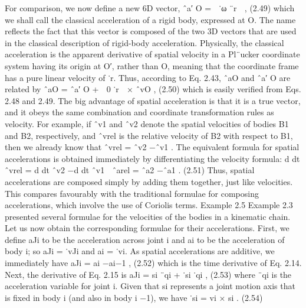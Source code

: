 For comparison, we now define a new 6D vector, ˆa′ O =  ˙ω ¨r  , (2.49) which we shall call the classical acceleration of a rigid body, expressed at O. The name reflects the fact that this vector is composed of the two 3D vectors that are used in the classical description of rigid-body acceleration. Physically, the classical acceleration is the apparent derivative of spatial velocity in a Pl¨ucker coordinate system having its origin at O′, rather than O, meaning that the coordinate frame has a pure linear velocity of ˙r. Thus, according to Eq. 2.43, ˆaO and ˆa′ O are related by ˆaO = ˆa′ O +  0 ˙r  × ˆvO , (2.50) which is easily verified from Eqs. 2.48 and 2.49. The big advantage of spatial acceleration is that it is a true vector, and it obeys the same combination and coordinate transformation rules as velocity. For example, if ˆv1 and ˆv2 denote the spatial velocities of bodies B1 and B2, respectively, and ˆvrel is the relative velocity of B2 with respect to B1, then we already know that ˆvrel = ˆv2 −ˆv1 . The equivalent formula for spatial accelerations is obtained immediately by differentiating the velocity formula: d dt ˆvrel = d dt ˆv2 −d dt ˆv1 ⇒ ˆarel = ˆa2 −ˆa1 . (2.51) Thus, spatial accelerations are composed simply by adding them together, just like velocities. This compares favourably with the traditional formulae for composing accelerations, which involve the use of Coriolis terms. Example 2.5 Example 2.3 presented several formulae for the velocities of the bodies in a kinematic chain. Let us now obtain the corresponding formulae for their accelerations. First, we define aJi to be the acceleration across joint i and ai to be the acceleration of body i; so aJi = ˙vJi and ai = ˙vi. As spatial accelerations are additive, we immediately have aJi = ai −ai−1 , (2.52) which is the time derivative of Eq. 2.14. Next, the derivative of Eq. 2.15 is aJi = si ¨qi + ˙si ˙qi , (2.53) where ¨qi is the acceleration variable for joint i. Given that si represents a joint motion axis that is fixed in body i (and also in body i −1), we have ˙si = vi × si . (2.54)


